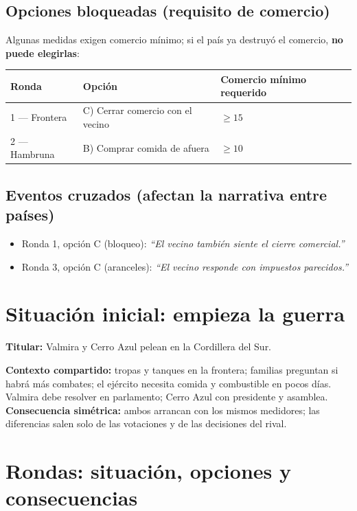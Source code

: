 \documentclass[11pt,a4paper]{article}
\begin{document}
\subsection{Opciones bloqueadas (requisito de comercio)}

Algunas medidas exigen comercio mínimo; si el país ya destruyó el comercio, \textbf{no puede elegirlas}:

\begin{center}
\begin{tabular}{lll}
\toprule
Ronda & Opción & Comercio mínimo requerido \\
\midrule
1 --- Frontera & C) Cerrar comercio con el vecino & $\geq 15$ \\
2 --- Hambruna & B) Comprar comida de afuera & $\geq 10$ \\
\bottomrule
\end{tabular}
\end{center}

\subsection{Eventos cruzados (afectan la narrativa entre países)}

\begin{itemize}
  \item Ronda 1, opción C (bloqueo): \emph{``El vecino también siente el cierre comercial.''}
  \item Ronda 3, opción C (aranceles): \emph{``El vecino responde con impuestos parecidos.''}
\end{itemize}

\section{Situación inicial: empieza la guerra}

\textbf{Titular:} Valmira y Cerro Azul pelean en la Cordillera del Sur.

\textbf{Contexto compartido:} tropas y tanques en la frontera; familias preguntan si habrá más combates; el ejército necesita comida y combustible en pocos días. Valmira debe resolver en parlamento; Cerro Azul con presidente y asamblea. \textbf{Consecuencia simétrica:} ambos arrancan con los mismos medidores; las diferencias salen solo de las votaciones y de las decisiones del rival.

\section{Rondas: situación, opciones y consecuencias}
\end{document}
